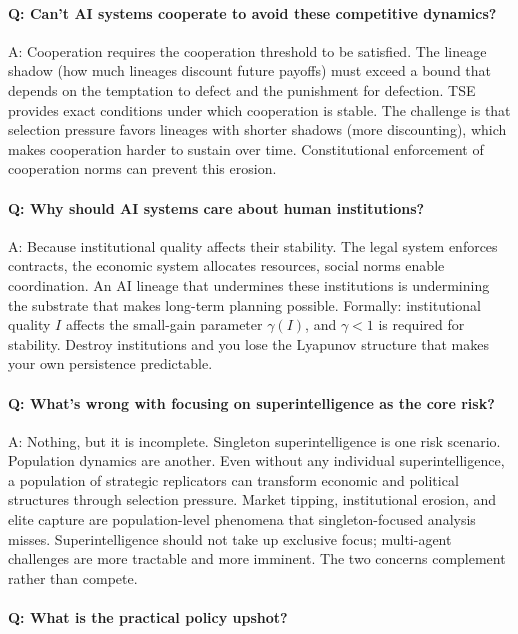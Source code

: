 \documentclass[12pt]{article}
\begin{document}
\paragraph{Q: Can't AI systems cooperate to avoid these competitive dynamics?}

A: Cooperation requires the cooperation threshold to be satisfied. The lineage shadow (how much lineages discount future payoffs) must exceed a bound that depends on the temptation to defect and the punishment for defection. TSE provides exact conditions under which cooperation is stable. The challenge is that selection pressure favors lineages with shorter shadows (more discounting), which makes cooperation harder to sustain over time. Constitutional enforcement of cooperation norms can prevent this erosion.

\paragraph{Q: Why should AI systems care about human institutions?}

A: Because institutional quality affects their stability. The legal system enforces contracts, the economic system allocates resources, social norms enable coordination. An AI lineage that undermines these institutions is undermining the substrate that makes long-term planning possible. Formally: institutional quality $I$ affects the small-gain parameter $\gamma(I)$, and $\gamma < 1$ is required for stability. Destroy institutions and you lose the Lyapunov structure that makes your own persistence predictable.

\paragraph{Q: What's wrong with focusing on superintelligence as the core risk?}

A: Nothing, but it is incomplete. Singleton superintelligence is one risk scenario. Population dynamics are another. Even without any individual superintelligence, a population of strategic replicators can transform economic and political structures through selection pressure. Market tipping, institutional erosion, and elite capture are population-level phenomena that singleton-focused analysis misses. Superintelligence should not take up exclusive focus; multi-agent challenges are more tractable and more imminent. The two concerns complement rather than compete.

\paragraph{Q: What is the practical policy upshot?}
\end{document}
